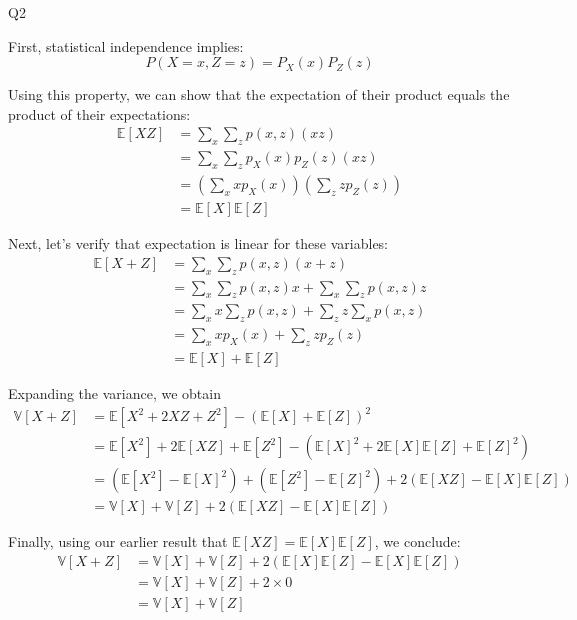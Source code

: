 \question Q2\droppoints

\begin{solution}
    First, statistical independence implies:
    \[
        P(X = x, Z = z) = P_X(x)P_Z(z)
    \]

    Using this property, we can show that the expectation of their product equals the product of their expectations:
    \[
        \begin{aligned}
            \mathbb{E}[XZ]
            &= \sum_{x}\sum_{z}{p(x, z)(xz)} \\
            &= \sum_{x}\sum_{z}{p_X(x)p_Z(z)(xz)} \\
            &= \left( \sum_{x}{xp_X(x)} \right) \left( \sum_{z}{zp_Z(z)} \right) \\
            &= \mathbb{E}[X]\mathbb{E}[Z]
        \end{aligned}
    \]

    Next, let's verify that expectation is linear for these variables:
    \[
        \begin{aligned}
            \mathbb{E}[X + Z]
            &= \sum_{x}\sum_{z}{p(x, z)(x + z)} \\
            &= \sum_{x}\sum_{z}{p(x, z)x} + \sum_{x}\sum_{z}{p(x, z)z} \\
            &= \sum_{x}{x}\sum_{z}p(x, z) + \sum_{z}{z}\sum_{x}p(x, z) \\
            &= \sum_{x}{xp_X(x)} + \sum_{z}{zp_Z(z)} \\
            &= \mathbb{E}[X] + \mathbb{E}[Z]
        \end{aligned}
    \]

    Expanding the variance, we obtain
    \[
        \begin{aligned}
            \mathbb{V}[X + Z]
            &= \mathbb{E}[X^2 + 2XZ + Z^2] - (\mathbb{E}[X] + \mathbb{E}[Z])^2 \\
            &= \mathbb{E}[X^2] + 2\mathbb{E}[XZ] + \mathbb{E}[Z^2] - (\mathbb{E}[X]^2 + 2\mathbb{E}[X]\mathbb{E}[Z] + \mathbb{E}[Z]^2) \\
            &= (\mathbb{E}[X^2] - \mathbb{E}[X]^2) +  (\mathbb{E}[Z^2] - \mathbb{E}[Z]^2) + 2(\mathbb{E}[XZ] - \mathbb{E}[X]\mathbb{E}[Z]) \\
            &= \mathbb{V}[X] + \mathbb{V}[Z] + 2(\mathbb{E}[XZ] - \mathbb{E}[X]\mathbb{E}[Z])
        \end{aligned}
    \]

    Finally, using our earlier result that $\mathbb{E}[XZ] = \mathbb{E}[X]\mathbb{E}[Z]$, we conclude:
    \[
        \begin{align*}
            \mathbb{V}[X + Z]
            &= \mathbb{V}[X] + \mathbb{V}[Z] + 2(\mathbb{E}[X]\mathbb{E}[Z] - \mathbb{E}[X]\mathbb{E}[Z]) \\
            &= \mathbb{V}[X] + \mathbb{V}[Z] + 2 \times 0 \\
            &= \mathbb{V}[X] + \mathbb{V}[Z] \\
        \end{align*}
    \]


\end{solution}
